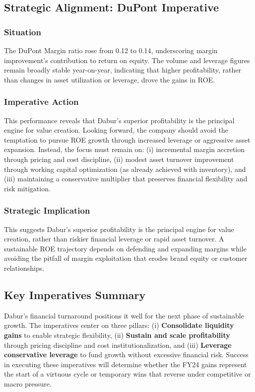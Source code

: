\documentclass[12pt, a4paper]{report}
\begin{document}
\subsection{Strategic Alignment: DuPont Imperative}

\subsubsection{Situation}
The DuPont Margin ratio rose from 0.12 to 0.14, underscoring margin improvement's contribution to return on equity. The volume and leverage figures remain broadly stable year-on-year, indicating that higher profitability, rather than changes in asset utilization or leverage, drove the gains in ROE.

\subsubsection{Imperative Action}
This performance reveals that Dabur's superior profitability is the principal engine for value creation. Looking forward, the company should avoid the temptation to pursue ROE growth through increased leverage or aggressive asset expansion. Instead, the focus must remain on: (i) incremental margin accretion through pricing and cost discipline, (ii) modest asset turnover improvement through working capital optimization (as already achieved with inventory), and (iii) maintaining a conservative multiplier that preserves financial flexibility and risk mitigation.

\subsubsection{Strategic Implication}
This suggests Dabur's superior profitability is the principal engine for value creation, rather than riskier financial leverage or rapid asset turnover. A sustainable ROE trajectory depends on defending and expanding margins while avoiding the pitfall of margin exploitation that erodes brand equity or customer relationships.

\subsection{Key Imperatives Summary}

Dabur's financial turnaround positions it well for the next phase of sustainable growth. The imperatives center on three pillars: (i) \textbf{Consolidate liquidity gains} to enable strategic flexibility, (ii) \textbf{Sustain and scale profitability} through pricing discipline and cost institutionalization, and (iii) \textbf{Leverage conservative leverage} to fund growth without excessive financial risk. Success in executing these imperatives will determine whether the FY24 gains represent the start of a virtuous cycle or temporary wins that reverse under competitive or macro pressure.
\end{document}
